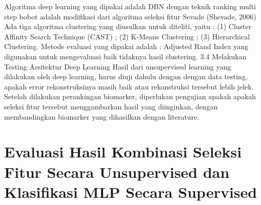 Algoritma deep learning yang dipakai adalah DBN dengan teknik ranking multi step bobot adalah modifikasi dari algoritma seleksi fitur Sevade (Shevade, 2006)
Ada tiga algoritma clustering yang diusulkan untuk diteliti, yaitu : (1) Cluster Affinity Search Technique (CAST) ; (2) K-Means Clustering ; (3) Hierarchical Clustering.
Metode evaluasi yang dipakai adalah :  Adjusted Rand Index  yang digunakan untuk mengevaluasi baik tidaknya hasil clustering.
3.4 Melakukan Testing Arsitektur Deep Learning
Hasil dari unsupervised learning yang dilakukan oleh deep learning, harus diuji dahulu dengan dengan data testing, apakah error rekonstruksinya masih baik atau rekonstruksi tersebut lebih jelek. Setelah dilakukan perankingan biomarker, diperlukan pengujian apakah apakah seleksi fitur tersebut menggambarkan hasil yang diinginkan, dengan membandingkan biomarker yang dihasilkan dengan literature.

\section{Evaluasi Hasil Kombinasi Seleksi Fitur Secara Unsupervised dan Klasifikasi MLP Secara Supervised}




